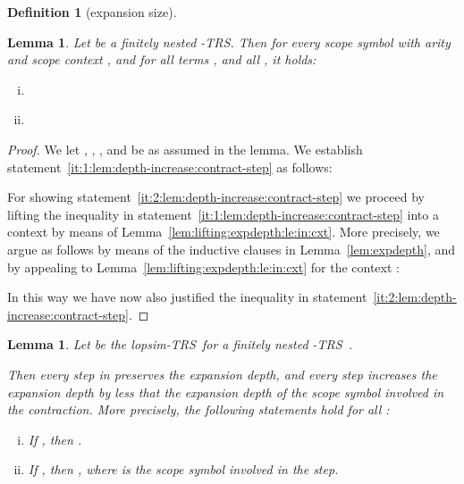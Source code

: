 \documentclass[
submission
]{dmtcs-episciences-tampered}
\newcommand{\nb}{\nobreakdash}
\newcommand{\TRS}{TRS}
\newcommand{\lopsimTRS}{lopsim-TRS}
\newcommand{\lTRS}{\hspace*{-0.5pt}\nb-\hspace*{-0.5pt}\TRS}
\theoremstyle{plain}
\newtheorem{lemma}[theorem]{Lemma}
\theoremstyle{definition}
\newtheorem{definition}[theorem]{Definition}
\begin{document}
\begin{definition}[expansion size]
{\begin{lemma}\label{lem:depth-increase:contract-step}
  Let  be a finitely nested \lTRS.
  Then for every scope symbol  with arity  and scope context ,
  and for all terms , and all , it holds:
  \begin{enumerate}[(i)]\setlength{\itemsep}{0ex}
    \item{}\label{it:1:lem:depth-increase:contract-step}
      
    \item{}\label{it:2:lem:depth-increase:contract-step}
      
  \end{enumerate}
\end{lemma}

\begin{proof}
  We let , , , and  be as assumed 
  in the lemma.
We establish statement~\eqref{it:1:lem:depth-increase:contract-step} as follows:
  
  
  For showing statement~\eqref{it:2:lem:depth-increase:contract-step} 
  we proceed by lifting the inequality in statement~\eqref{it:1:lem:depth-increase:contract-step} into a context
  by means of Lemma~\ref{lem:lifting:expdepth:le:in:cxt}.
  More precisely, we argue as follows by means of the inductive clauses in Lemma~\ref{lem:expdepth},
  and by appealing to Lemma~\ref{lem:lifting:expdepth:le:in:cxt} 
  for the context :
  
  In this way we have now also justified the inequality in statement~\eqref{it:2:lem:depth-increase:contract-step}.
\end{proof}





\begin{lemma}\label{lem:expdepth:lopsimred:steps}
  Let  be the \lopsimTRS\ 
  for a finitely nested \lTRS~.
  
  Then every  step in  preserves the expansion depth,
  and every  step increases the expansion depth by less that the expansion depth
  of the scope symbol  involved in the contraction. 
  More precisely, the following statements hold for all :
  \begin{enumerate}[(i)]\setlength{\itemsep}{0.5ex} \item{}\label{it:1:lem:expdepth:lopsimred:steps}
      If , then .
    \item{}\label{it:2:lem:expdepth:lopsimred:steps}
      If , then ,
      where  is the scope symbol involved in the step.   
\end{enumerate}
\end{lemma}

}
\end{definition}
\end{document}
